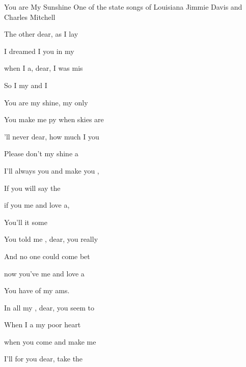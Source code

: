 \begin{SBSong}{You are My Sunshine}
  {One of the state songs of Louisiana}
  {Jimmie Davis and Charles Mitchell}
  \begin{SBVerse}
    The other  dear, as I lay 
    
    I dreamed I  you in my 

     when I a, dear, I was mis 
    
    So I  my  and I  
  \end{SBVerse}
  \begin{SBChorus}
    You are my shine, my only 
    
    You make me py when skies are 
    
    'll never  dear, how much I  you 
    
    Please don't  my shine a 
  \end{SBChorus}
  \WBPageBrk
  \begin{SBVerse}
    I'll always  you and make you ,
    
    If you will  say the 
    
     if you  me and love a, 
    
    You'll  it  some  
  \end{SBVerse}
  \begin{SBVerse}
    You told me , dear, you really 
    
    And no one  could come bet
    
     now you've  me and love a 
    
    You have   of my ams. 
  \end{SBVerse}
  \begin{SBVerse}
    In all my , dear, you seem to 
    
    When I a my poor heart 
    
     when you come  and make me  
    
    I'll for you dear,  take the  
  \end{SBVerse}
\end{SBSong}

